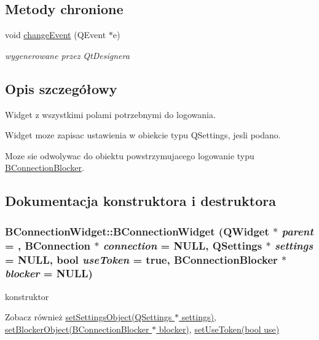 \subsection*{Metody chronione}
\begin{DoxyCompactItemize}
\item 
void \hyperlink{class_b_connection_widget_a7396f6332ea7735a6a330fc11927d183}{changeEvent} (QEvent $\ast$e)
\begin{DoxyCompactList}\small\item\em wygenerowane przez QtDesignera \item\end{DoxyCompactList}\end{DoxyCompactItemize}


\subsection{Opis szczegółowy}
Widget z wszystkimi polami potrzebnymi do logowania. \begin{DoxyItemize}
\item Widget moze zapisac ustawienia w obiekcie typu QSettings, jesli podano. \item Moze sie odwolywac do obiektu powstrzymujacego logowanie typu \hyperlink{class_b_connection_blocker}{BConnectionBlocker}. \end{DoxyItemize}


\subsection{Dokumentacja konstruktora i destruktora}
\hypertarget{class_b_connection_widget_af549f688fe132260b6a1333cde59dba7}{
\subsubsection[{BConnectionWidget}]{\setlength{\rightskip}{0pt plus 5cm}BConnectionWidget::BConnectionWidget (QWidget $\ast$ {\em parent} = {}, \/  {\bf BConnection} $\ast$ {\em connection} = {\ttfamily NULL}, \/  QSettings $\ast$ {\em settings} = {\ttfamily NULL}, \/  bool {\em useToken} = {\ttfamily true}, \/  {\bf BConnectionBlocker} $\ast$ {\em blocker} = {\ttfamily NULL})}}
\label{class_b_connection_widget_af549f688fe132260b6a1333cde59dba7}


konstruktor \begin{DoxySeeAlso}{Zobacz również}
\hyperlink{class_b_connection_widget_a45070066f5da8af537f422d8b37c7d6e}{setSettingsObject(QSettings $\ast$ settings)}, \hyperlink{class_b_connection_widget_a976657d9910495a76d16b7c90d0b54fc}{setBlockerObject(BConnectionBlocker $\ast$ blocker)}, \hyperlink{class_b_connection_widget_a80d71ca868172dc623b9fa6c1ab938a6}{setUseToken(bool use)} 
\end{DoxySeeAlso}

